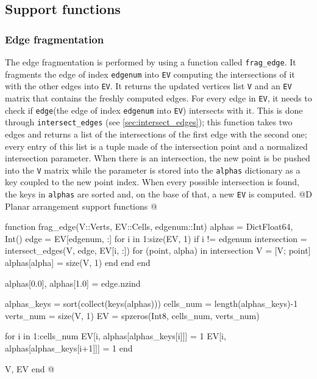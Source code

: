 \documentclass[10pt,oneside]{article}
\begin{document}
\subsection{Support functions}
\subsubsection{Edge fragmentation}
\label{sec:frag_edge}
The edge fragmentation is performed by using a function called \texttt{frag\_edge}.
It fragments the edge of index \texttt{edgenum} into \texttt{EV} computing the intersections of
it with the other edges into \texttt{EV}. It returns the updated vertices list \texttt{V} and an 
\texttt{EV} matrix that contains the freshly computed edges.
For every edge in \texttt{EV}, it needs to check if \texttt{edge}(the edge of index \texttt{edgenum} into 
\texttt{EV}) intersects with it. This is done through \texttt{intersect\_edges} (see \ref{sec:intersect_edges}); 
this function takes two edges and returns a list of the intersections of the first edge with the second one; 
every entry of this list is a tuple made of the intersection point and a normalized intersection parameter. 
When there is an intersection, the new point is be pushed into the \texttt{V} matrix while the parameter 
is stored into the \texttt{alphas} dictionary as a key coupled to the new point index.
When every possible intersection is found, the keys in \texttt{alphas} are sorted and, on the base of that,
a new \texttt{EV} is computed.
@D Planar arrangement support functions
@{function frag_edge(V::Verts, EV::Cells, edgenum::Int)
    alphas = Dict{Float64, Int}()
    edge = EV[edgenum, :]
    for i in 1:size(EV, 1)
        if i != edgenum
            intersection = intersect_edges(V, edge, EV[i, :])
            for (point, alpha) in intersection
                V = [V; point]
                alphas[alpha] = size(V, 1)
            end
        end
    end

    alphas[0.0], alphas[1.0] = edge.nzind

    alphas_keys = sort(collect(keys(alphas)))
    cells_num = length(alphas_keys)-1
    verts_num = size(V, 1)
    EV = spzeros(Int8, cells_num, verts_num)

    for i in 1:cells_num
        EV[i, alphas[alphas_keys[i]]] = 1
        EV[i, alphas[alphas_keys[i+1]]] = 1
    end

    V, EV
end
@}
\end{document}
